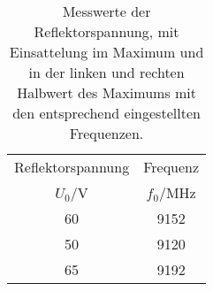 \begin{table}[!h]
	\centering
	\begin{tabular}{cc}
		\toprule
		Reflektorspannung & Frequenz\\
		$U_0$/\si{V} & $f_0$/\si{MHz}\\
\midrule
		\num{60} & \num{9152}\\
		\num{50} & \num{9120}\\
		\num{65} & \num{9192}\\
		\bottomrule
	\end{tabular}
	\caption{Messwerte der Reflektorspannung, mit Einsattelung im Maximum
                    und in der linken und rechten Halbwert des Maximums mit den 
                    entsprechend eingestellten Frequenzen.
                 \label{tab:Elektrische Abstimmung}}
\end{table}
